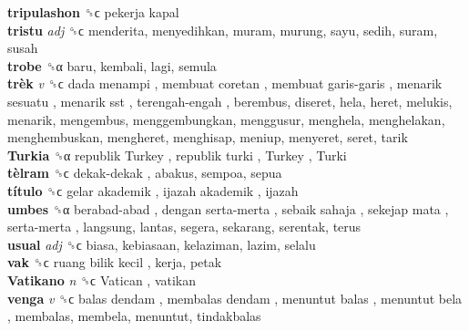 \textbf{tripulashon} ␝ϲ   pekerja kapal   \\
\textbf{tristu} \emph{adj}  ␝ϲ  menderita, menyedihkan, muram, murung, sayu, sedih, suram, susah  \\
\textbf{trobe} ␝α  baru, kembali, lagi, semula  \\
\textbf{trèk} \emph{v}  ␝ϲ   dada menampi ,  membuat coretan ,  membuat garis-garis ,  menarik sesuatu ,  menarik sst ,  terengah-engah , berembus, diseret, hela, heret, melukis, menarik, mengembus, menggembungkan, menggusur, menghela, menghelakan, menghembuskan, mengheret, menghisap, meniup, menyeret, seret, tarik  \\
\textbf{Turkia} ␝α   republik Turkey ,  republik turki ,  Turkey ,  Turki   \\
\textbf{tèlram} ␝ϲ   dekak-dekak , abakus, sempoa, sepua  \\
\textbf{título} ␝ϲ   gelar akademik ,  ijazah akademik , ijazah  \\
\textbf{umbes} ␝α   berabad-abad ,  dengan serta-merta ,  sebaik sahaja ,  sekejap mata ,  serta-merta , langsung, lantas, segera, sekarang, serentak, terus  \\
\textbf{usual} \emph{adj}  ␝ϲ  biasa, kebiasaan, kelaziman, lazim, selalu  \\
\textbf{vak} ␝ϲ   ruang bilik kecil , kerja, petak  \\
\textbf{Vatikano} \emph{n}  ␝ϲ   Vatican , vatikan  \\
\textbf{venga} \emph{v}  ␝ϲ   balas dendam ,  membalas dendam ,  menuntut balas ,  menuntut bela , membalas, membela, menuntut, tindakbalas  \\
